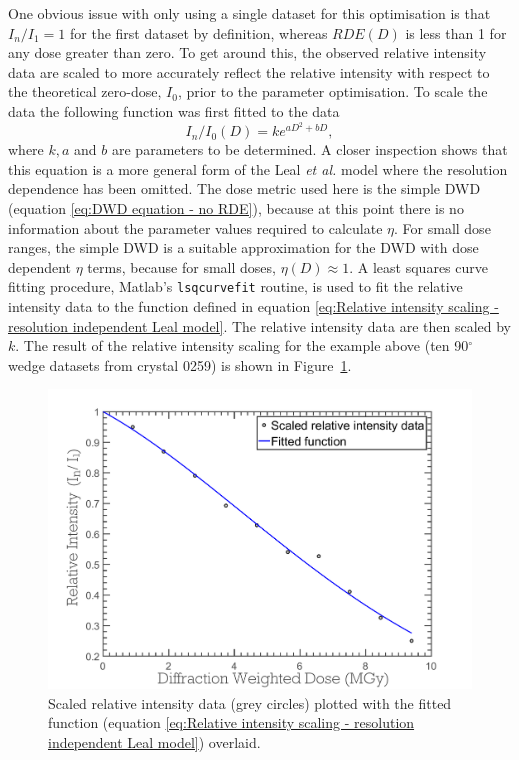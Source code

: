 One obvious issue with only using a single dataset for this optimisation is that $I_n/I_1 = 1$ for the first dataset by definition, whereas $RDE(D)$ is less than 1 for any dose greater than zero.
To get around this, the observed relative intensity data are scaled to more accurately reflect the relative intensity with respect to the theoretical zero-dose, $I_0$, prior to the parameter optimisation.
To scale the data the following function was first fitted to the data
\begin{equation}
    I_n/I_0(D) = k e^{aD^2 + bD},
    \label{eq:Relative intensity scaling - resolution independent Leal model}
\end{equation}
where $k, a$ and $b$ are parameters to be determined.
A closer inspection shows that this equation is a more general form of the Leal \textit{et al.} model where the resolution dependence has been omitted.
The dose metric used here is the simple DWD (equation \ref{eq:DWD equation - no RDE}), because at this point there is no information about the parameter values required to calculate $\eta$.
For small dose ranges, the simple DWD is a suitable approximation for the DWD with dose dependent $\eta$ terms, because for small doses, $\eta(D) \approx 1$.
A least squares curve fitting procedure, Matlab's \verb+lsqcurvefit+ routine, is used to fit the relative intensity data to the function defined in equation \ref{eq:Relative intensity scaling - resolution independent Leal model}.
The relative intensity data are then scaled by $k$.
The result of the relative intensity scaling for the example above (ten 90$^{\circ}$ wedge datasets from crystal 0259) is shown in Figure~\ref{fig:Scaled relative intensity data - ZDE}.
\begin{figure}
  \centering
    \includegraphics[width=1\textwidth]{figures/zde/ScaledFunctionFitPlot.pdf}
    \caption{Scaled relative intensity data (grey circles) plotted with the fitted function (equation \ref{eq:Relative intensity scaling - resolution independent Leal model}) overlaid.}
    \label{fig:Scaled relative intensity data - ZDE}
\end{figure}
